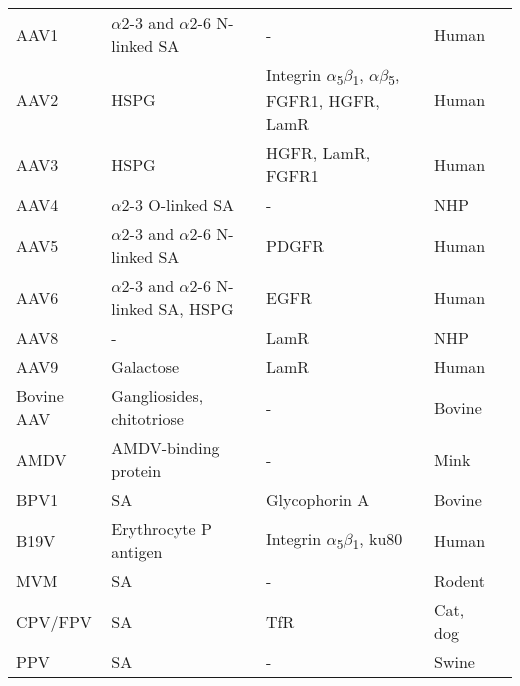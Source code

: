 \begin{small}
\begin{center}
\begin{longtable}{P{0.7in} P{1.65in} P{1.45in} P{0.6in} P{0.8in}}
AAV1 & $\alpha$2-3 and $\alpha$2-6 N-linked SA & - & Human & \cite{pmid16940521} \\
AAV2 & HSPG & Integrin $\alpha$\textsubscript{5}$\beta$\textsubscript{1}, $\alpha$\textsubscript{}$\beta$\textsubscript{5}, FGFR1, HGFR, LamR & Human & \cite{pmid16973587, pmid15596854, pmid9883842, pmid9883843, pmid9445046, pmid16940508} \\
AAV3 & HSPG & HGFR, LamR, FGFR1 & Human & \cite{pmid16973587, pmid20545554, pmid16195782} \\
AAV4 & $\alpha$2-3 O-linked SA & - & NHP & \cite{pmid11435568} \\
AAV5 & $\alpha$2-3 and $\alpha$2-6 N-linked SA & PDGFR & Human & \cite{pmid14502277, pmid16409121, pmid11262413, pmid11435568} \\   
AAV6 & $\alpha$2-3 and $\alpha$2-6 N-linked SA, HSPG & EGFR & Human & \cite{pmid20473307, pmid16940521, pmid16943302} \\  
AAV8 & - & LamR & NHP & \cite{pmid16973587} \\
AAV9 & Galactose & LamR & Human & \cite{pmid16973587, pmid21576824, pmid21330365} \\
Bovine AAV & Gangliosides, chitotriose & - & Bovine & \cite{pmid20231878, pmid16699032} \\
AMDV & AMDV-binding protein & - & Mink & \cite{pmid10196278} \\
BPV1 & SA & Glycophorin A & Bovine & \cite{pmid15750863, pmid9747725} \\
B19V & Erythrocyte P antigen & Integrin $\alpha$\textsubscript{5}$\beta$\textsubscript{1}, ku80 & Human & \cite{pmid8211117, pmid15661151, pmid12907437, pmid16076874, weigel} \\
MVM & SA & - & Rodent & \cite{pmid3296697, pmid15229399, pmid16822863} \\
CPV/FPV & SA & TfR & Cat, dog & \cite{pmid11264378, pmid12525605} \\
PPV & SA & - & Swine & \cite{pmid20484503} \\

     
\end{longtable}
\end{center} 
\end{small}


